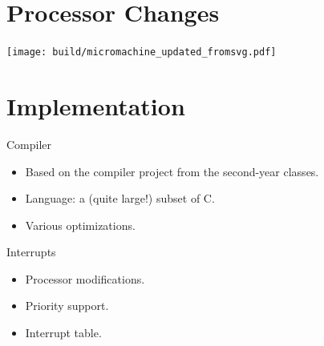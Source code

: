 \documentclass{beamer}
\begin{document}
  \section{Processor Changes}
    \begin{landscape}
        \begin{frame}[plain]
            \texttt{[image: build/micromachine\_updated\_fromsvg.pdf]}

        \end{frame}
    \end{landscape}

  \section{Implementation}
    \begin{frame}{Compiler}
      \begin{itemize}
        \item Based on the compiler project from the second-year classes.
        \item Language: a (quite large!) subset of C.
        \item Various optimizations.
      \end{itemize}
    \end{frame}

    \begin{frame}{Interrupts}
      \begin{itemize}
        \item Processor modifications.
        \item Priority support.
        \item Interrupt table.
      \end{itemize}
    \end{frame}
\end{document}
